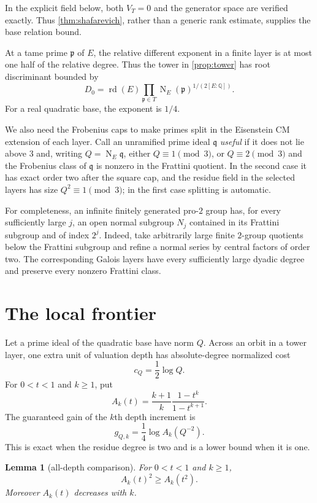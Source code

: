 \documentclass[11pt]{article}
\newtheorem{lemma}[theorem]{Lemma}
\theoremstyle{definition}
\theoremstyle{remark}
\newcommand{\Q}{\mathbb Q}
\newcommand{\rd}{\operatorname{rd}}
\newcommand{\Nm}{\operatorname N}
\begin{document}
In the explicit field below, both $V_T=0$ and the generator space are
verified exactly.  Thus \cref{thm:shafarevich}, rather than a generic rank
estimate, supplies the base relation bound.

At a tame prime $\mathfrak p$ of $E$, the relative different exponent in a
finite layer is at most one half of the relative degree.  Thus the tower in
\cref{prop:tower} has root discriminant bounded by
\[
 D_0=\rd(E)\prod_{\mathfrak p\in T}
              \Nm_E(\mathfrak p)^{1/(2[E:\Q])}.         \tag{3.6}
\]
For a real quadratic base, the exponent is $1/4$.

We also need the Frobenius caps to make primes split in the Eisenstein CM
extension of each layer.  Call an unramified prime ideal $\mathfrak q$
\emph{useful} if it does not lie above $3$ and, writing
$Q=\Nm_E\mathfrak q$, either $Q\equiv1\pmod3$, or $Q\equiv2\pmod3$ and the
Frobenius class of $\mathfrak q$ is nonzero in the Frattini quotient.  In the
second case it has exact order two after the square cap, and the residue
field in the selected layers has size $Q^2\equiv1\pmod3$; in the first case
splitting is automatic.

For completeness, an infinite finitely generated pro-$2$ group has, for
every sufficiently large $j$, an open normal subgroup $N_j$ contained in
its Frattini subgroup and of index $2^j$.  Indeed, take arbitrarily large
finite $2$-group quotients below the Frattini subgroup and refine a normal
series by central factors of order two.  The corresponding Galois layers
have every sufficiently large dyadic degree and preserve every nonzero
Frattini class.

\section{The local frontier}

Let a prime ideal of the quadratic base have norm $Q$.  Across an orbit in
a tower layer, one extra unit of valuation depth has absolute-degree
normalized cost
\[
 c_Q=\frac12\log Q.                                \tag{4.1}\label{eq:item-cost}
\]
For $0<t<1$ and $k\ge1$, put
\[
 A_k(t)=\frac{k+1}{k}\frac{1-t^k}{1-t^{k+1}}.     \tag{4.2}
\]
The guaranteed gain of the $k$th depth increment is
\[
 g_{Q,k}=\frac14\log A_k(Q^{-2}).                 \tag{4.3}\label{eq:item-gain}
\]
This is exact when the residue degree is two and is a lower bound when it
is one.

\begin{lemma}[all-depth comparison]\label{lem:all-depth}
For $0<t<1$ and $k\ge1$,
\[
 A_k(t)^2\ge A_k(t^2).
\]
Moreover $A_k(t)$ decreases with $k$.
\end{lemma}
\end{document}
